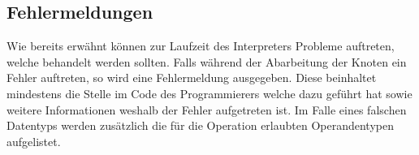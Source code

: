 \subsection{Fehlermeldungen}
\label{Fehlermeldungen}
Wie bereits erwähnt können zur Laufzeit des Interpreters Probleme auftreten, welche behandelt werden sollten. Falls während der Abarbeitung der Knoten ein Fehler auftreten, so wird eine Fehlermeldung ausgegeben. Diese beinhaltet mindestens die Stelle im Code des Programmierers welche dazu geführt hat sowie weitere Informationen weshalb der Fehler aufgetreten ist. Im Falle eines falschen Datentyps werden zusätzlich die für die Operation erlaubten Operandentypen aufgelistet.
